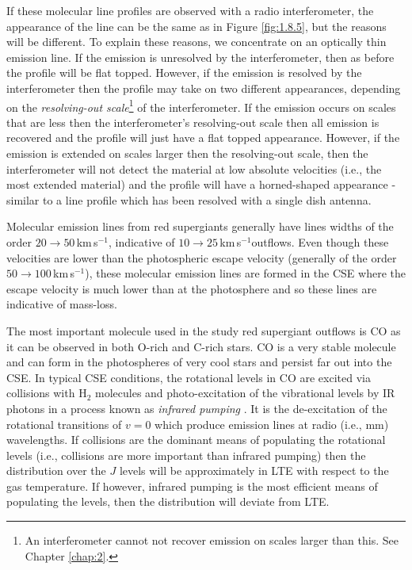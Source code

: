 If these molecular line profiles are observed with a radio interferometer, the appearance of the line can be the same as in Figure \ref{fig:1.8.5}, but the reasons will be different. To explain these reasons, we concentrate on an optically thin emission line. If the emission is unresolved by the interferometer, then as before the profile will be flat topped. However, if the emission is resolved by the interferometer then the profile may take on two different appearances, depending on the \textit{resolving-out scale}\footnote{ An interferometer cannot not recover emission on scales larger than this. See Chapter \ref{chap:2}.} of the interferometer. If the emission occurs on scales that are less then the interferometer's resolving-out scale then all emission is recovered and the profile will just have a flat topped appearance. However, if the emission is extended on scales larger then the resolving-out scale, then the interferometer will not detect the material at low absolute velocities (i.e., the most extended material) and the profile will have a horned-shaped appearance - similar to a line profile which has been resolved with a single dish antenna.

Molecular emission lines from red supergiants generally have lines widths of the order $20\rightarrow 50$\,km\,s$^{-1}$, indicative of $10 \rightarrow 25$\,km\,s$^{-1} $outflows. Even though these velocities are lower than the photospheric escape velocity (generally of the order $50\rightarrow 100$\,km\,s$^{-1}$), these molecular emission lines are formed in the CSE where the escape velocity is much lower than at the photosphere and so these lines are indicative of mass-loss.

The most important molecule used in the study red supergiant outflows is CO as it can be observed in both O-rich and C-rich stars. CO is a very stable molecule and can form in the photospheres of very cool stars and persist far out into the CSE. In typical CSE conditions, the rotational levels in CO are excited via collisions with H$_{2}$ molecules and photo-excitation of the vibrational levels by IR photons in a process known as \textit{infrared pumping} \citep{lamers_1999}. It is the de-excitation of the rotational transitions of $v=0$ which produce emission lines at radio (i.e., mm) wavelengths. If collisions are the dominant means of populating the rotational levels (i.e., collisions are more important than infrared pumping) then the distribution over the $J$ levels will be approximately in LTE with respect to the gas temperature. If however, infrared pumping is the most efficient means of populating the levels, then the distribution will deviate from LTE. 

